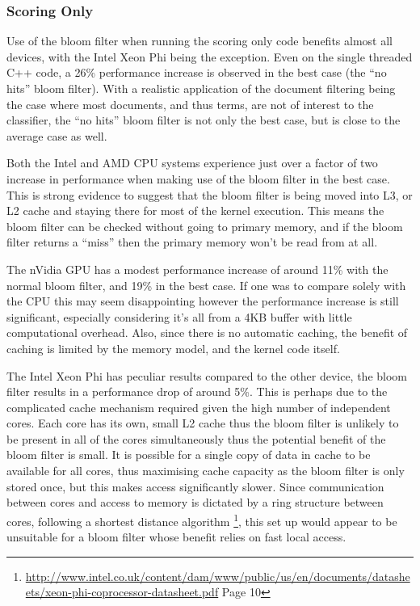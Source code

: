 \subsubsection{Scoring Only}

Use of the bloom filter when running the scoring only code benefits almost all
devices, with the Intel Xeon Phi being the exception. Even on the single
threaded C++ code, a 26\% performance increase is observed in the best case (the
``no hits'' bloom filter). With a realistic application of the document
filtering being the case where most documents, and thus terms, are not of
interest to the classifier, the ``no hits'' bloom filter is not only the best
case, but is close to the average case as well.

Both the Intel and AMD CPU systems experience just over a factor of two increase
in performance when making use of the bloom filter in the best case. This is
strong evidence to suggest that the bloom filter is being moved into L3, or L2
cache and staying there for most of the kernel execution. This means the bloom
filter can be checked without going to primary memory, and if the bloom filter
returns a ``miss'' then the primary memory won't be read from at all.

The nVidia GPU has a modest performance increase of around 11\% with the normal
bloom filter, and 19\% in the best case. If one was to compare solely with the
CPU this may seem disappointing however the performance increase is still
significant, especially considering it's all from a 4KB buffer with little
computational overhead. Also, since there is no automatic caching, the benefit
of caching is limited by the memory model, and the kernel code itself.

The Intel Xeon Phi has peculiar results compared to the other device, the bloom
filter results in a performance drop of around 5\%. This is perhaps due to the
complicated cache mechanism required given the high number of independent cores.
Each core has its own, small L2 cache thus the bloom filter is unlikely to be
present in all of the cores simultaneously thus the potential benefit of the
bloom filter is small. It is possible for a single copy of data in cache to be
available for all cores, thus maximising cache capacity as the bloom filter is
only stored once, but this makes access significantly slower. Since
communication between cores and access to memory is dictated by a ring structure
between cores, following a shortest distance algorithm
\footnote{\url{http://www.intel.co.uk/content/dam/www/public/us/en/documents/datasheets/xeon-phi-coprocessor-datasheet.pdf}
Page 10}, this set up would appear to be unsuitable for a bloom filter whose
benefit relies on fast local access.

